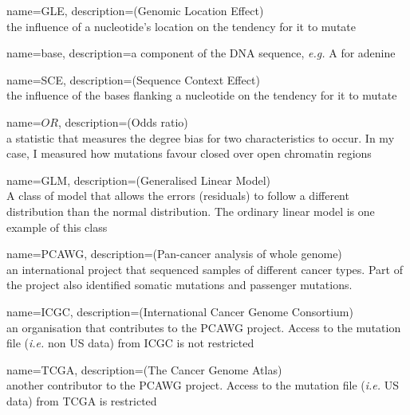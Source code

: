 \makeglossaries
{}
{
        name=GLE,
        description={(Genomic Location Effect) \\ the influence of a nucleotide's location on the tendency for it to mutate}
}


{
        name=base,
        description={a component of the DNA sequence,  \textit{e.g.} A for adenine}
}

{
        name=SCE,
        description={(Sequence Context Effect) \\ the influence of the bases flanking a nucleotide on the tendency for it to mutate}
}

{
        name=$OR$,
        description={(Odds ratio) \\ a statistic that measures the degree bias for two characteristics to occur. In my case, I measured how mutations favour closed over open chromatin regions}
}

{
        name=GLM,
        description={(Generalised Linear Model) \\ A class of model that allows the errors (residuals) to follow a different distribution than the normal distribution. The ordinary linear model is one example of this class}
}

{
        name=PCAWG,
        description={(Pan-cancer analysis of whole genome) \\ an international project that sequenced samples of different cancer types. Part of the project also identified somatic mutations and passenger mutations.}
}

{
        name=ICGC,
        description={(International Cancer Genome Consortium) \\ an organisation that contributes to the PCAWG project. Access to the mutation file (\textit{i.e.} non US data) from ICGC is not restricted}
}

{
        name=TCGA,
        description={(The Cancer Genome Atlas) \\ another contributor to the PCAWG project. Access to the mutation file (\textit{i.e.} US data) from TCGA is restricted}
}

